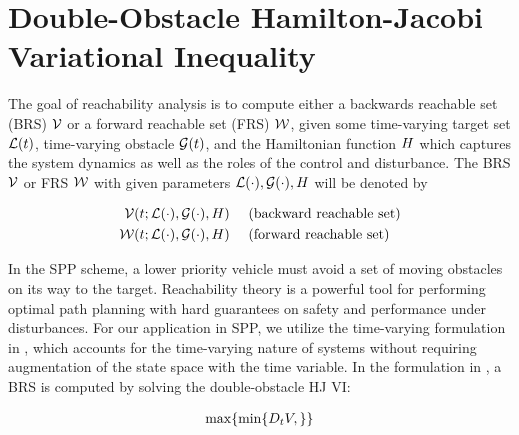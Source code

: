 \section{Double-Obstacle Hamilton-Jacobi Variational Inequality \label{sec:HJIVI}}
The goal of reachability analysis is to compute either a backwards reachable set (BRS) $\mathcal{V}$ or a forward reachable set (FRS) $\mathcal{W}$, given some time-varying target set $\mathcal{L}(t)$, time-varying obstacle $\mathcal{G}(t)$, and the Hamiltonian function $H$ which captures the system dynamics as well as the roles of the control and disturbance. The BRS $\mathcal{V}$ or FRS $\mathcal{W}$ with given parameters $\mathcal{L}(\cdot), \mathcal{G}(\cdot), H$ will be denoted by

\begin{equation}
\begin{aligned}
\mathcal{V}(t; \mathcal{L}(\cdot), \mathcal{G}(\cdot), H) &\quad \text{ (backward reachable set)}\\
\mathcal{W}(t; \mathcal{L}(\cdot), \mathcal{G}(\cdot), H) &\quad \text{ (forward reachable set)}
\end{aligned}
\end{equation}

In the SPP scheme, a lower priority vehicle must avoid a set of moving obstacles on its way to the target. Reachability theory is a powerful tool for performing optimal path planning with hard guarantees on safety and performance under disturbances. For our application in SPP, we utilize the time-varying formulation in \cite{}, which accounts for the time-varying nature of systems without requiring augmentation of the state space with the time variable. In the formulation in \cite{}, a BRS is computed by solving the double-obstacle HJ VI:

\begin{equation}
\begin{aligned}
\max \{ \min \{D_t V,  \} \}
\end{aligned}
\end{equation}


